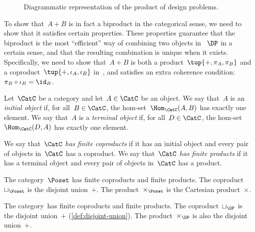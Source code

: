 \begin{figure}[h!]
  \begin{center}
  \end{center}
  \caption{Diagrammatic representation of the product of design problems. \label{fig:productdp}}
\end{figure}


To show that~$A + B$ is in fact a biproduct in the categorical sense, we need to show that it satisfies certain properties. These properties guarantee that the biproduct is the most ``efficient'' way of combining two objects in~$~\DP$ in a certain sense, and that the resulting combination is unique when it exists. Specifically, we need to show that~$A + B$ is both a product~$\tup{+, \pi_A, \pi_B}$ and a coproduct~$\tup{+, \iota_A, \iota_B}$ in~\DP, and satisfies an extra coherence condition:~$\pi_B \circ \iota_B = \id_B$.

\begin{ctdefinition}
  Let~$\CatC$ be a category and let~$A \in \CatC$ be an object. We say that~$A$ is an \emph{initial object} if, for all~$B \in\CatC$, the hom-set~$\Hom_\CatC(A,B)$ has exactly one element. We say that~$A$ is a \emph{terminal object} if, for all~$D\in\CatC$, the hom-set~$\Hom_\CatC(D,A)$ has exactly one element.
\end{ctdefinition}

\begin{ctdefinition}
  We say that~$\CatC$ \emph{has finite coproducts} if it has an initial object and every pair of objects in~$\CatC$ has a coproduct.
  We say that~$\CatC$ \emph{has finite products} if it has a terminal object and every pair of objects in~$\CatC$ has a product.
\end{ctdefinition}

\begin{example}
  The category~$\Poset$ has finite coproducts and finite products.
  The coproduct~$\sqcup_\Poset$ is the disjoint union~$+$.
  The product~$\times_\Poset$ is the Cartesian product~$\times$.
\end{example}

\begin{lemma}
  The category~\DP has finite coproducts and finite products.
  The coproduct~$\sqcup_\DP$ is the disjoint union~$+$ (\cref{def:disjoint-union}).
  The product~$\times_\DP$ is also the disjoint union~$+$.
\end{lemma}

